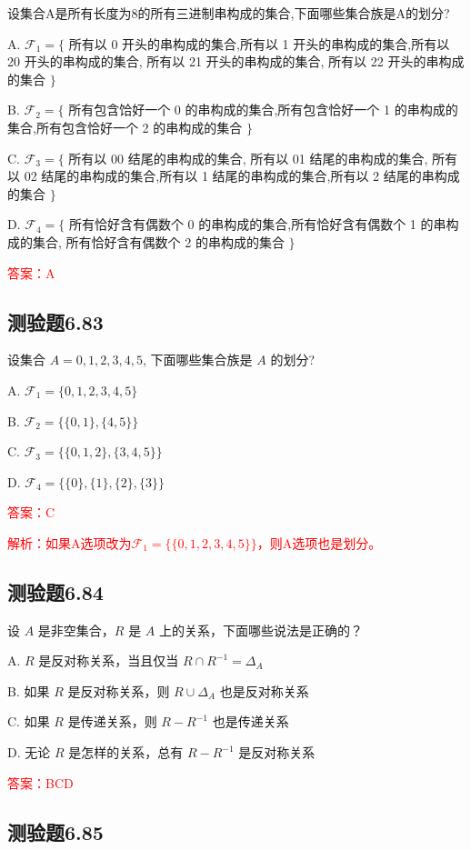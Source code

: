\documentclass[UTF8, heading=true]{ctexart}
\begin{document}
设集合A是所有长度为8的所有三进制串构成的集合,下面哪些集合族是A的划分?

A. $\mathcal{F}_1=\{$ 所有以 0 开头的串构成的集合,所有以 1 开头的串构成的集合,所有以 20 开头的串构成的集合, 所有以 21 开头的串构成的集合, 所有以 22 开头的串构成的集合 $\}$

B. $\mathcal{F}_2=\{$ 所有包含饸好一个 0 的串构成的集合,所有包含恰好一个 1 的串构成的集合,所有包含恰好一个 2 的串构成的集合 $\}$

C. $\mathcal{F}_3=\{$ 所有以 00 结尾的串构成的集合, 所有以 01 结尾的串构成的集合, 所有以 02 结尾的串构成的集合,所有以 1 结尾的串构成的集合,所有以 2 结尾的串构成的集合 $\}$

D. $\mathcal{F}_4=\{$ 所有恰好含有偶数个 0 的串构成的集合,所有恰好含有偶数个 1 的串构成的集合, 所有恰好含有偶数个 2 的串构成的集合 $\}$

\textcolor{red}{答案：A}

\subsection{测验题6.83}
设集合 $A={0,1,2,3,4,5}$, 下面哪些集合族是 $A$ 的划分?

A. $\mathcal{F}_1=\{0,1,2,3,4,5\}$

B. $\mathcal{F}_2=\{\{0,1\},\{4,5\}\}$

C. $\mathcal{F}_3=\{\{0,1,2\},\{3,4,5\}\}$

D. $\mathcal{F}_4=\{\{0\},\{1\},\{2\},\{3\}\}$

\textcolor{red}{答案：C}

\textcolor{red}{解析：如果A选项改为$\mathcal{F}_1=\{\{0,1,2,3,4,5\}\}$，则A选项也是划分。}

\subsection{测验题6.84}

设 $A$ 是非空集合，$R$ 是 $A$ 上的关系，下面哪些说法是正确的？

A. $R$ 是反对称关系，当且仅当 $R \cap R^{-1}=\Delta_A$

B. 如果 $R$ 是反对称关系，则 $R \cup \Delta_A$ 也是反对称关系

C. 如果 $R$ 是传递关系，则 $R-R^{-1}$ 也是传递关系

D. 无论 $R$ 是怎样的关系，总有 $R-R^{-1}$ 是反对称关系

\textcolor{red}{答案：BCD}

\subsection{测验题6.85}
\end{document}

